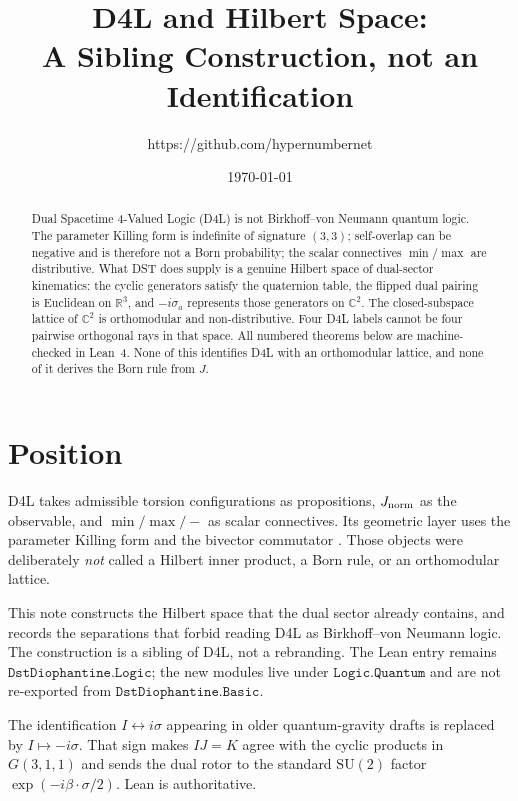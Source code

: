 \documentclass[dvipdfmx,11pt,a4paper]{article}
\title{D4L and Hilbert Space:\\
A Sibling Construction, not an Identification}
\author{https://github.com/hypernumbernet}
\date{\today}
\theoremstyle{definition}
\theoremstyle{remark}
\newcommand{\Jnorm}{J_{\rm norm}}
\begin{document}
\maketitle

\begin{abstract}
Dual Spacetime 4-Valued Logic (D4L) is not Birkhoff--von Neumann quantum
logic. The parameter Killing form is indefinite of signature $(3,3)$;
self-overlap can be negative and is therefore not a Born probability;
the scalar connectives $\min/\max$ are distributive. What DST does
supply is a genuine Hilbert space of dual-sector kinematics: the cyclic
generators satisfy the quaternion table, the flipped dual pairing is
Euclidean on $\mathbb{R}^3$, and $-i\sigma_a$ represents those generators
on $\mathbb{C}^2$. The closed-subspace lattice of $\mathbb{C}^2$ is
orthomodular and non-distributive. Four D4L labels cannot be four
pairwise orthogonal rays in that space. All numbered theorems below are
machine-checked in Lean~4. None of this identifies D4L with an
orthomodular lattice, and none of it derives the Born rule from $J$.
\end{abstract}

\section{Position}
\label{sec:pos}

D4L \cite{D4L2026} takes admissible torsion configurations as
propositions, $\Jnorm$ as the observable, and $\min/\max/-$ as scalar
connectives. Its geometric layer uses the parameter Killing form and
the bivector commutator \cite{Diophantine2026}. Those objects were
deliberately \emph{not} called a Hilbert inner product, a Born rule, or
an orthomodular lattice.

This note constructs the Hilbert space that the dual sector already
contains, and records the separations that forbid reading D4L as
Birkhoff--von Neumann logic. The construction is a sibling of D4L, not
a rebranding. The Lean entry remains $\texttt{DstDiophantine.Logic}$;
the new modules live under $\texttt{Logic.Quantum}$ and are not
re-exported from $\texttt{DstDiophantine.Basic}$.

The identification $I\leftrightarrow i\sigma$ appearing in older
quantum-gravity drafts is replaced by $I\mapsto -i\sigma$. That sign
makes $IJ=K$ agree with the cyclic products in $G(3,1,1)$ and sends the
dual rotor to the standard $\mathrm{SU}(2)$ factor
$\exp(-i\beta\cdot\sigma/2)$. Lean is authoritative.
\end{document}
